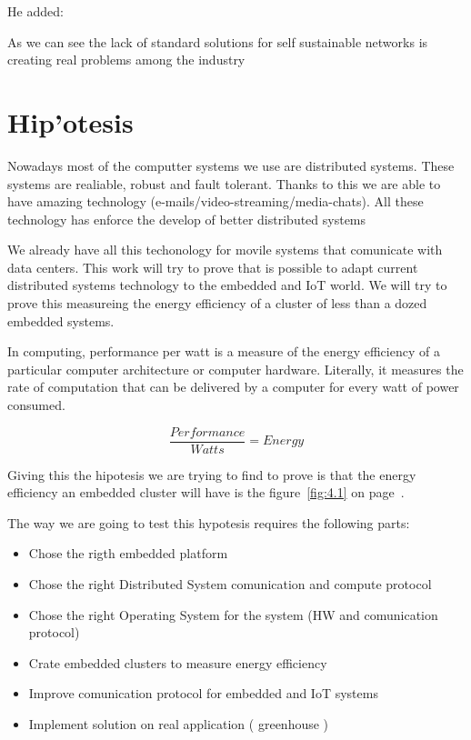 He added: 


As we can see the lack of standard solutions for self sustainable networks is 
creating real problems among the industry

\section{Hip'otesis}
\noindent

Nowadays most of the computter systems we use are distributed systems. These
systems are realiable, robust and fault tolerant. Thanks to this we are able to
have amazing technology (e-mails/video-streaming/media-chats). All these
technology has enforce the develop of better distributed systems

We already have all this techonology for movile systems that comunicate with
data centers. This work will try to prove that is possible to adapt current
distributed systems technology to the embedded and IoT world. We will try to
prove this measureing the energy efficiency of a cluster of less than a dozed 
embedded systems. 

In computing, performance per watt is a measure of the energy efficiency of a
particular computer architecture or computer hardware. Literally, it measures
the rate of computation that can be delivered by a computer for every watt of
power consumed. 

 
\begin{equation}
    \dfrac {Performance}{Watts} = Energy
\end{equation}

Giving this the hipotesis we are trying to find to prove is that the energy
efficiency an embedded cluster will have is the 
figure~\ref{fig:4.1} on page~\pageref{fig:4.1}.

The way we are going to test this hypotesis requires the following parts:


\begin{itemize}
\item Chose the rigth embedded platform 
\item Chose the right Distributed System comunication and compute protocol
\item Chose the right Operating System for the system (HW and comunication protocol) 
\item Crate embedded clusters to measure energy efficiency
\item Improve comunication protocol for embedded and IoT systems
\item Implement solution on real application ( greenhouse )
\end{itemize}

